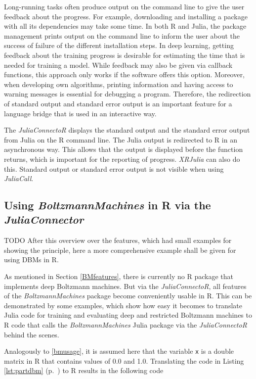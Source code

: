 \documentclass[12pt]{article}
\newcommand{\inlinecode}[1]{\texttt{#1}}
\newcommand{\apkg}[1]{\emph{#1}}
\begin{document}
Long-running tasks often produce output on the command line to give the user feedback about the progress.
For example, downloading and installing a package with all its dependencies may take some time.
In both R and Julia, the package management prints output on the command line to inform the user about the success of failure of the different installation steps.
In deep learning, getting feedback about the training progress is desirable for estimating the time that is needed for training a model.
While feedback may also be given via callback functions, this approach only works if the software offers this option.
Moreover, when developing own algorithms, printing information and having access to warning messages is essential for debugging a program.
Therefore, the redirection of standard output and standard error output is an important feature for a language bridge that is used in an interactive way.

The \apkg{JuliaConnectoR} displays the standard output and the standard error output from Julia on the R command line.
The Julia output is redirected to R in an asynchronous way.
This allows that the output is displayed before the function returns, which is important for the reporting of progress.
\apkg{XRJulia} can also do this. Standard output or standard error output is not visible when using \apkg{JuliaCall}.



\subsection{Using \apkg{BoltzmannMachines} in R via the \apkg{JuliaConnector}}\label{juliaconnectorDbmexample}
TODO After this overview over the features, which had small examples for showing the principle, here a more comprehensive example shall be given for using DBMs in R.

As mentioned in Section \ref{BMfeatures}, there is currently no R package that implements deep Boltzmann machines.
But via the \apkg{JuliaConnectoR}, all features of the \apkg{BoltzmannMachines} package become conveniently usable in R.
This can be demonstrated by some examples, which show how easy it becomes to translate Julia code for training and evaluating deep and restricted Boltzmann machines to R code that calls the \apkg{BoltzmannMachines} Julia package via the \apkg{JuliaConnectoR} behind the scenes.


Analogously to \ref{bmusage}, it is assumed here that the variable \inlinecode{x} is a double matrix in R that contains values of 0.0 and 1.0.
Translating the code in Listing \ref{lst:partdbm} (p.~\pageref{lst:partdbm}) to R results in the following code
\end{document}
